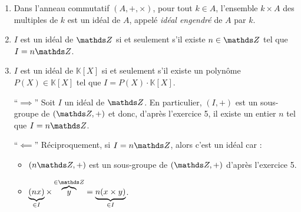 \begin{prop}
	\begin{enumerate}
		\item Dans l'anneau commutatif $(A, +, \times)$, pour tout $k \in A$, l'ensemble $k \times A$ des multiples de $k$ est un idéal de $A$, appelé \textit{idéal engendré} de $A$ par $k$.
		\item $I$\/ est un idéal de $\Z$\/ si et seulement s'il existe $n \in \Z$\/ tel que $I = n\Z$.
		\item $I$\/ est un idéal de $\mathds{K}[X]$\/ si et seulement s'il existe un polynôme $P(X) \in \mathds{K}[X]$\/ tel que $I = P(X) \cdot \mathds{K}[X]$.
	\end{enumerate}
\end{prop}

\begin{prv}[2.]
	\begin{itemize}
		\item[``$\implies$''] Soit $I$\/ un idéal de $\Z$. En particulier, $(I,+)$\/ est un sous-groupe de $(\Z, +)$ et donc, d'après l'{\sc exercice 5}, il existe un entier $n$\/ tel que $I = n\Z$.
		\item[``$\impliedby$\/''] Réciproquement, si $I = n\Z$, alors c'est un idéal car :
			\begin{itemize}
				\item $(n\Z, +)$\/ est un sous-groupe de $(\Z, +)$\/ d'après l'{\sc exercice}\/ 5.
				\item $\underbrace{(nx)}_{\in I} \times \overbrace{y}^{\in \Z} = \underbrace{n(x \times y)}_{\in I}$.
			\end{itemize}
	\end{itemize}
\end{prv}



